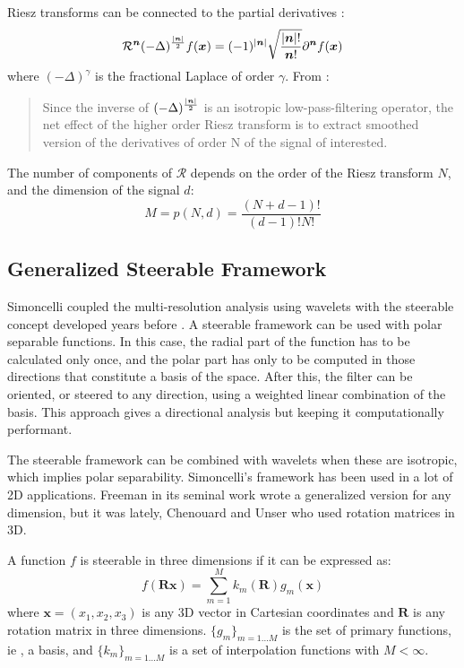Riesz transforms can be connected to the partial derivatives \cite{unser_steerable_2011}:
\begin{equation*}
\label{eq:riesz_partial_derivatives}
\mathcal{R}^{\bm{n}}(-\Delta)^{\frac{\abs{\bm{n}}}{2}}f(\bm{x}) = (-1)^{\abs{\bm{n}}}\sqrt{\frac{\abs{\bm{n}}!}{\bm{n}!}}\partial^{\bm{n}}f(\bm{x})
\end{equation*}
where $(-\Delta)^\gamma$ is the fractional Laplace of order $\gamma$. From \cite{unser_steerable_2011}: \blockquote{Since the inverse of $(-\Delta)^{\frac{\abs{\bm{n}}}{2}}$ is an isotropic low-pass-filtering operator, the net effect of the higher order Riesz transform is to extract smoothed version of the derivatives of order N of the signal of interested.}

The number of components of $\bm{\mathcal{R}}$ depends on the order of the Riesz transform $N$, and the dimension of the signal $d$:
\begin{equation}
\label{eq:riesz_components}
 M = p(N,d) = \frac{(N+d-1)!}{(d-1)! N!}
\end{equation}

\subsection{Generalized Steerable Framework}
Simoncelli \cite{simoncelli_steerable_1995} coupled the multi-resolution analysis using wavelets with the steerable concept developed years before \cite{freeman_design_1991}. A steerable framework can be used with polar separable functions. In this case, the radial part of the function has to be calculated only once, and the polar part has only to be computed in those directions that constitute a basis of the space. After this, the filter can be oriented, or steered to any direction, using a weighted linear combination of the basis. This approach gives a directional analysis but keeping it computationally performant.

The steerable framework can be combined with wavelets when these are isotropic, which implies polar separability.
Simoncelli's framework has been used in a lot of 2D applications. Freeman in its seminal work \cite{freeman_design_1991} wrote a generalized version for any dimension, but it was lately, Chenouard and Unser \cite{held_steerable_2010,unser_steerable_2011,chenouard_3d_2012} who used rotation matrices in 3D.

\begin{definition}
A function $f$ is steerable in three dimensions if it can be expressed as:
\begin{equation}
  f(\bm{Rx}) = \sum_{m=1}^M k_m(\bm{R})g_m(\bm{x})
\end{equation}
where $\bm{x} = (x_1,x_2,x_3)$ is any 3D vector in Cartesian coordinates and $\bm{R}$ is any rotation matrix in three dimensions.
$\{g_m\}_{m=1...M}$ is the set of primary functions, ie , a basis, and $\{k_m\}_{m=1...M}$ is a set of interpolation functions with $M < \infty$.
\end{definition}


